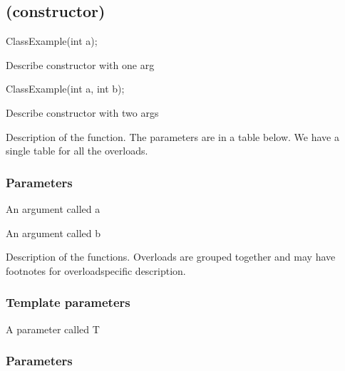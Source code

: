 \documentclass[letterpaper,10pt,english]{sphinxmanual}
\begin{document}
\subsection{(constructor)}
\label{\detokenize{style-guide/ClassExample:constructor}}
\begin{sphinxVerbatim}[commandchars=\\\{\}]
\end{sphinxVerbatim}
\begin{sphinxalltt}
ClassExample(int a);            \begin{footnote}[1]\sphinxAtStartFootnote
Describe constructor with one arg
\end{footnote}
\end{sphinxalltt}
\begin{sphinxalltt}
ClassExample(int a, int b);     \begin{footnote}[2]\sphinxAtStartFootnote
Describe constructor with two args
\end{footnote}
\end{sphinxalltt}

Description of the function. The parameters are in a table below. We
have a single table for all the overloads.
\subsubsection*{Parameters}

\begin{DUlineblock}{0em}
\item[]  \sphinxhyphen{} An argument called a
\item[]  \sphinxhyphen{} An argument called b
\end{DUlineblock}

Description of the functions. Overloads are grouped together and may
have footnotes for overload\sphinxhyphen{}specific description.
\subsubsection*{Template parameters}

\begin{DUlineblock}{0em}
\item[]  \sphinxhyphen{} A parameter called T
\end{DUlineblock}
\subsubsection*{Parameters}
\end{document}
